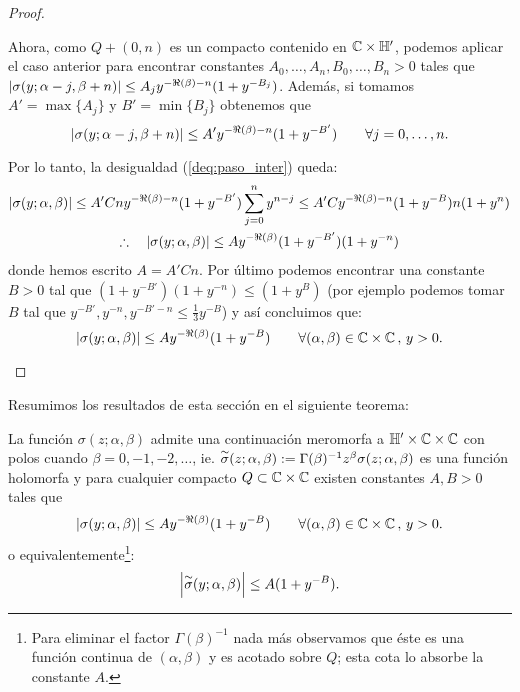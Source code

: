 \documentclass[../../tesis_maestria]{subfiles}
\begin{document}
\begin{proof}
\begin{itemize}
  Ahora, como $Q+(0,n)$ es un compacto contenido en $\mathbb{C}\times\mathbb{H}'$, podemos aplicar el
  caso anterior para encontrar constantes $A_0,\ldots,A_n,B_0,\ldots,B_n>0$ tales que
  $\left| \sigma(y;\alpha-j,\beta+n) \right|\leq A_jy^{-\Re(\beta)-n}(1+y^{-B_j})$. Adem\'as, si tomamos
  $A'=\max\{A_j\}$ y $B'=\min\{B_j\}$ obtenemos que
  \[
    \left| \sigma(y;\alpha-j,\beta+n) \right|\leq A' y^{-\Re(\beta)-n}(1+y^{-B'}) \qquad\forall j=0,\ldots,n.
  \]

  Por lo tanto, la desigualdad (\ref{deq:paso_inter}) queda:
  \begin{gather*}
    \left| \sigma(y;\alpha,\beta) \right|\leq A'Cny^{-\Re(\beta)-n}(1+y^{-B'})\sum_{j=0}^ny^{n-j}
    \leq A'Cy^{-\Re(\beta)-n}(1+y^{-B})n(1+y^n)\\
    \therefore\quad\left| \sigma(y;\alpha,\beta) \right|\leq Ay^{-\Re(\beta)}(1+y^{-B'})(1+y^{-n})
  \end{gather*}
  donde hemos escrito $A=A'Cn$. Por \'ultimo podemos encontrar una constante $B>0$
  tal que $(1+y^{-B'})(1+y^{-n})\leq(1+y^B)$ (por ejemplo podemos tomar $B$ tal que
  $y^{-B'},y^{-n},y^{-B'-n}\leq \tfrac{1}{3}y^{-B}$) y as\'i concluimos que:
  \[
    \left| \sigma(y;\alpha,\beta) \right|\leq Ay^{-\Re(\beta)}(1+y^{-B})
    \qquad\forall (\alpha,\beta)\in\mathbb{C}\times\mathbb{C} \, ,\, y>0.
  \]
\end{itemize}
\end{proof}

Resumimos los resultados de esta secci\'on en el siguiente teorema:

\begin{thm}\label{thm:prop_sigma}
  La funci\'on $\sigma(z;\alpha,\beta)$ admite una continuaci\'on meromorfa a $\mathbb{H}'\times\mathbb{C}\times\mathbb{C}$
  con polos cuando $\beta=0,-1,-2,\ldots$, ie.
  $\overset{\sim}{\sigma}(z;\alpha,\beta):=\Gamma(\beta)^{-1}z^{\beta}\sigma(z;\alpha,\beta)$ es una funci\'on
  holomorfa y para cualquier compacto $Q\subset\mathbb{C}\times\mathbb{C}$ existen constantes $A,B>0$ tales que
  \[
    \left| \sigma(y;\alpha,\beta) \right|\leq Ay^{-\Re(\beta)}(1+y^{-B})
    \qquad \forall (\alpha,\beta)\in\mathbb{C}\times\mathbb{C} \, ,\, y>0.
  \]
  o equivalentemente\footnote{Para eliminar el factor $\Gamma(\beta)^{-1}$ nada m\'as observamos
    que \'este es una funci\'on continua de $(\alpha,\beta)$ y es acotado sobre $Q$; esta cota lo
    absorbe la constante $A$.}:
  \[
    \left| \overset{\sim}{\sigma}(y;\alpha,\beta) \right|\leq A(1+y^{-B}).
  \]
\end{thm}
\end{document}
